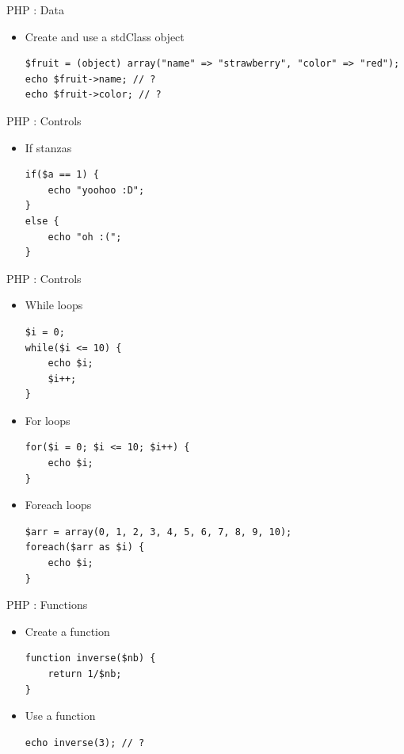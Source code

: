 \documentclass{beamer}
\begin{document}
\begin{frame}[fragile]{PHP : Data}
    \begin{itemize}
        \item Create and use a stdClass object
        \begin{lstlisting}
$fruit = (object) array("name" => "strawberry", "color" => "red");
echo $fruit->name; // ?
echo $fruit->color; // ?
        \end{lstlisting}
    \end{itemize}
\end{frame}

\begin{frame}[fragile]{PHP : Controls}
    \begin{itemize}
        \item If stanzas
        \begin{lstlisting}
if($a == 1) {
    echo "yoohoo :D";
}
else {
    echo "oh :(";
}

        \end{lstlisting}
    \end{itemize}
\end{frame}

\begin{frame}[fragile]{PHP : Controls}
    \begin{itemize}
        \item While loops
        \begin{lstlisting}
$i = 0;
while($i <= 10) {
    echo $i;
    $i++;
}
        \end{lstlisting}
        \item For loops
        \begin{lstlisting}
for($i = 0; $i <= 10; $i++) {
    echo $i;
}
        \end{lstlisting}
        \item Foreach loops
        \begin{lstlisting}
$arr = array(0, 1, 2, 3, 4, 5, 6, 7, 8, 9, 10);
foreach($arr as $i) {
    echo $i;
}
        \end{lstlisting}
    \end{itemize}
\end{frame}

\begin{frame}[fragile]{PHP : Functions}
    \begin{itemize}
        \item Create a function
        \begin{lstlisting}
function inverse($nb) {
    return 1/$nb;
}
        \end{lstlisting}
        \item Use a function
        \begin{lstlisting}
echo inverse(3); // ?
        \end{lstlisting}
    \end{itemize}
\end{frame}
\end{document}
